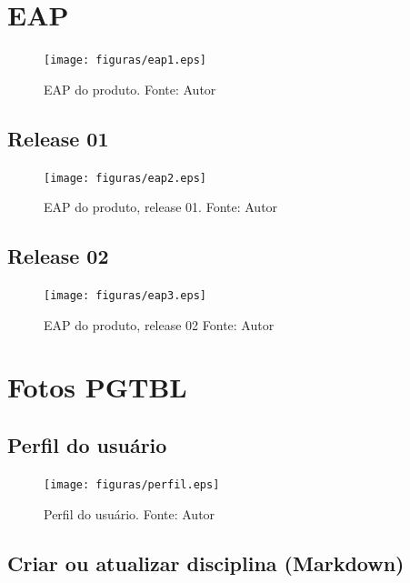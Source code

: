 \begin{apendicesenv}

\partapendices

\chapter{EAP} \label{apendice:eap}

\begin{figure}[h!]
	\centering
  \texttt{[image: figuras/eap1.eps]}
  \caption[EAP do produto.]{EAP do produto. Fonte: Autor}
	\label{fig:eap}
\end{figure}

\section{Release 01}

\begin{figure}[h!]
	\centering
  \texttt{[image: figuras/eap2.eps]}
  \caption[EAP do produto, release 01]{EAP do produto, release 01. Fonte: Autor}
	\label{fig:eap}
\end{figure}

\section{Release 02}

\begin{figure}[h!]
	\centering
  \texttt{[image: figuras/eap3.eps]}
  \caption[EAP do produto, release 02.]{EAP do produto, release 02 Fonte: Autor}
	\label{fig:eap}
\end{figure}

\chapter{Fotos PGTBL} \label{apendice:fotos}

\section{Perfil do usuário}

\begin{figure}[h!]
	\centering
  \texttt{[image: figuras/perfil.eps]}
  \caption[Perfil do usuário]{Perfil do usuário. Fonte: Autor}
	\label{fig:perfil}
\end{figure}

\section{Criar ou atualizar disciplina (Markdown)}


\end{apendicesenv}
